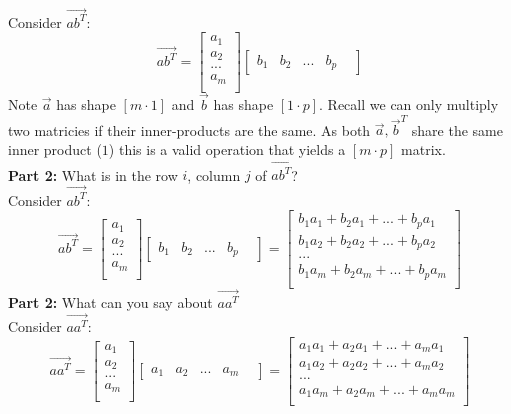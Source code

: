 \documentclass[11pt]{article}
\theoremstyle{plain}
\begin{document}
Consider $\vec{ab^T}$:
\[
	\vec{ab^T} =
	\begin{bmatrix}
		a_1 \\
		a_2 \\
		... \\
		a_m \\
	\end{bmatrix}
	\begin{bmatrix}
		b_1 &
		b_2 &
		... &
		b_p &
	\end{bmatrix}
\]
Note $\vec{a}$ has shape $[m \cdot 1]$ and $\vec{b}$ has shape $[1 \cdot p]$. Recall we can only multiply two matricies if their inner-products are the same. As both $\vec{a}, \vec{b}^T$ share the same inner product ($1$) this is a valid operation that yields a $[m \cdot p]$ matrix.  \\
\textbf{Part 2:} What is in the row $i$, column $j$ of $\vec{ab^T}$?\\
Consider $\vec{ab^T}$:
\[
	\vec{ab^T} =
	\begin{bmatrix}
		a_1 \\
		a_2 \\
		... \\
		a_m \\
	\end{bmatrix}
	\begin{bmatrix}
		b_1 & b_2 & ... & b_p &
	\end{bmatrix}
	=
	\begin{bmatrix}
		b_1 a_1 + b_2 a_1 + ... + b_p a_1 \\
		b_1 a_2 + b_2 a_2 + ... + b_p a_2 \\
		...                               \\
		b_1 a_m + b_2 a_m + ... + b_p a_m \\
	\end{bmatrix}
\]
\textbf{Part 2:} What can you say about $\vec{aa^T}$ \\
Consider $\vec{aa^T}$:
\[
	\vec{aa^T} =
	\begin{bmatrix}
		a_1 \\
		a_2 \\
		... \\
		a_m \\
	\end{bmatrix}
	\begin{bmatrix}
		a_1 & a_2 & ... & a_m &
	\end{bmatrix}
	=
	\begin{bmatrix}
		a_1 a_1 + a_2 a_1 + ... + a_m a_1 \\
		a_1 a_2 + a_2 a_2 + ... + a_m a_2 \\
		...                               \\
		a_1 a_m + a_2 a_m + ... + a_m a_m \\
	\end{bmatrix}
\]
\end{document}
